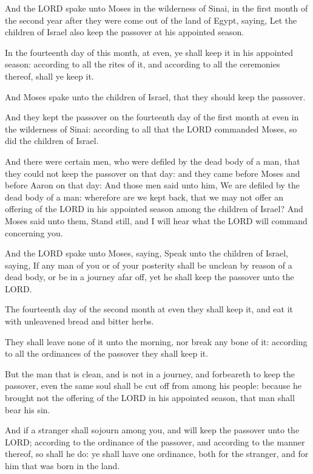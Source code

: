 \Chapter
\Verse And the LORD spake unto Moses in the wilderness of Sinai, in the
first month of the second year after they were come out of the land of
Egypt, saying, \Verse Let the children of Israel also keep the passover
at his appointed season.

\Verse In the fourteenth day of this month, at even, ye shall keep it in
his appointed season: according to all the rites of it, and according
to all the ceremonies thereof, shall ye keep it.

\Verse And Moses spake unto the children of Israel, that they should keep
the passover.

\Verse And they kept the passover on the fourteenth day of the first
month at even in the wilderness of Sinai: according to all that the
LORD commanded Moses, so did the children of Israel.

\Verse And there were certain men, who were defiled by the dead body of a
man, that they could not keep the passover on that day: and they came
before Moses and before Aaron on that day: \Verse And those men said unto
him, We are defiled by the dead body of a man: wherefore are we kept
back, that we may not offer an offering of the LORD in his appointed
season among the children of Israel?  \Verse And Moses said unto them,
Stand still, and I will hear what the LORD will command concerning
you.

\Verse And the LORD spake unto Moses, saying, \Verse Speak unto the
children of Israel, saying, If any man of you or of your posterity
shall be unclean by reason of a dead body, or be in a journey afar
off, yet he shall keep the passover unto the LORD.

\Verse The fourteenth day of the second month at even they shall keep
it, and eat it with unleavened bread and bitter herbs.

\Verse They shall leave none of it unto the morning, nor break any bone
of it: according to all the ordinances of the passover they shall keep
it.

\Verse But the man that is clean, and is not in a journey, and
forbeareth to keep the passover, even the same soul shall be cut off
from among his people: because he brought not the offering of the LORD
in his appointed season, that man shall bear his sin.

\Verse And if a stranger shall sojourn among you, and will keep the
passover unto the LORD; according to the ordinance of the passover,
and according to the manner thereof, so shall he do: ye shall have one
ordinance, both for the stranger, and for him that was born in the
land.


